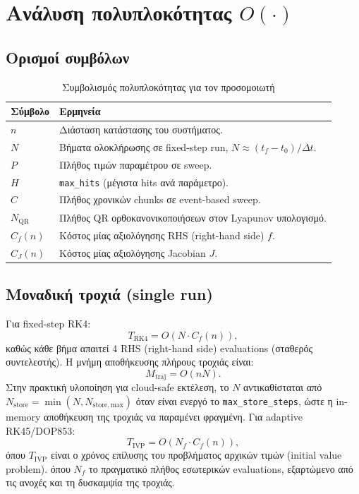 \documentclass[11pt,a4paper]{report}
\begin{document}
\section{Ανάλυση πολυπλοκότητας \texorpdfstring{$O(\cdot)$}{O(.)}}
\label{sec:ch2-complexity}

\subsection{Ορισμοί συμβόλων}

\begin{table}[H]
\centering
\caption{Συμβολισμός πολυπλοκότητας για τον προσομοιωτή}
\label{tab:ch2-complexity-symbols}
\renewcommand{\arraystretch}{1.15}
\begin{tabular}{|l|p{}|}
\hline
\textbf{Σύμβολο} & \textbf{Ερμηνεία} \\
\hline
$n$ & Διάσταση κατάστασης του συστήματος. \\
\hline
$N$ & Βήματα ολοκλήρωσης σε fixed-step run, $N \approx (t_f-t_0)/\Delta t$. \\
\hline
$P$ & Πλήθος τιμών παραμέτρου σε sweep. \\
\hline
$H$ & \texttt{max\_hits} (μέγιστα hits ανά παράμετρο). \\
\hline
$C$ & Πλήθος χρονικών chunks σε event-based sweep. \\
\hline
$N_{\mathrm{QR}}$ & Πλήθος QR ορθοκανονικοποιήσεων στον Lyapunov υπολογισμό. \\
\hline
$C_f(n)$ & Κόστος μίας αξιολόγησης RHS (right-hand side) $f$. \\
\hline
$C_J(n)$ & Κόστος μίας αξιολόγησης Jacobian $J$. \\
\hline
\end{tabular}
\end{table}

\subsection{Μοναδική τροχιά (single run)}

Για fixed-step RK4:
\begin{equation}
T_{\mathrm{RK4}} = O\!\left(N \cdot C_f(n)\right),
\end{equation}
καθώς κάθε βήμα απαιτεί 4 RHS (right-hand side) evaluations (σταθερός συντελεστής).
Η μνήμη αποθήκευσης πλήρους τροχιάς είναι:
\begin{equation}
M_{\mathrm{traj}} = O(nN).
\end{equation}
Στην πρακτική υλοποίηση για cloud-safe εκτέλεση, το \(N\) αντικαθίσταται από
\(N_{\mathrm{store}}=\min(N,N_{\mathrm{store,max}})\) όταν είναι ενεργό το
\texttt{max\_store\_steps}, ώστε η in-memory αποθήκευση της τροχιάς να παραμένει φραγμένη.
Για adaptive RK45/DOP853:
\begin{equation}
T_{\mathrm{IVP}} = O\!\left(N_f \cdot C_f(n)\right),
\end{equation}
όπου \(T_{\mathrm{IVP}}\) είναι ο χρόνος επίλυσης του προβλήματος αρχικών τιμών (initial value problem).
όπου $N_f$ το πραγματικό πλήθος εσωτερικών evaluations, εξαρτώμενο από τις
ανοχές και τη δυσκαμψία της τροχιάς.
\end{document}
